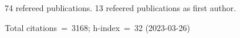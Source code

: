 74 refereed publications. 13 refeered publications as first author.

Total citations~=~3168; h-index~=~32 (2023-03-26)